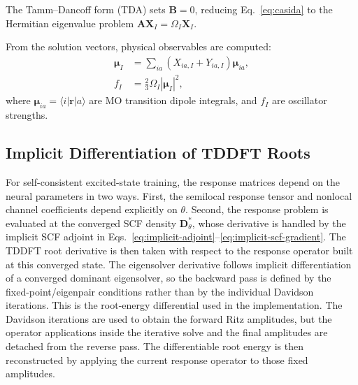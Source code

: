 The Tamm--Dancoff form (TDA) sets $\mathbf{B}=0$,
reducing Eq.~\eqref{eq:casida} to the Hermitian eigenvalue problem
$\mathbf{A}\mathbf{X}_I = \Omega_I \mathbf{X}_I$.

From the solution vectors, physical observables are computed:
\begin{align}
  \boldsymbol{\mu}_I &=
    \sum_{ia} (X_{ia,I} + Y_{ia,I})
    \boldsymbol{\mu}_{ia}, \label{eq:transdip} \\
  f_I &= \frac{2}{3}\Omega_I |\boldsymbol{\mu}_I|^2,
    \label{eq:oscstr}
\end{align}
where $\boldsymbol{\mu}_{ia} = \langle i|\mathbf{r}|a\rangle$ are
MO transition dipole integrals, and $f_I$ are oscillator strengths.

\subsection{Implicit Differentiation of TDDFT Roots}
\label{sec:tddft-implicit-roots}

For self-consistent excited-state training, the response matrices
depend on the neural parameters in two ways. First, the semilocal
response tensor and nonlocal channel coefficients depend explicitly
on $\theta$. Second, the response problem is evaluated at the
converged SCF density $\mathbf{D}^*_\theta$, whose derivative is
handled by the implicit SCF adjoint in
Eqs.~\eqref{eq:implicit-adjoint}--\eqref{eq:implicit-scf-gradient}.
The TDDFT root derivative is then taken with respect to the response
operator built at this converged state. The eigensolver derivative
follows implicit differentiation of a converged dominant eigensolver,
so the backward pass is defined by the fixed-point/eigenpair
conditions rather than by the individual Davidson iterations.
\cite{Xie2020DominantEigensolverAD}
This is the root-energy differential used in the implementation. The
Davidson iterations are used to obtain the forward Ritz amplitudes,
but the operator applications inside the iterative solve and the final
amplitudes are detached from the reverse pass. The differentiable
root energy is then reconstructed by applying the current response
operator to those fixed amplitudes.

